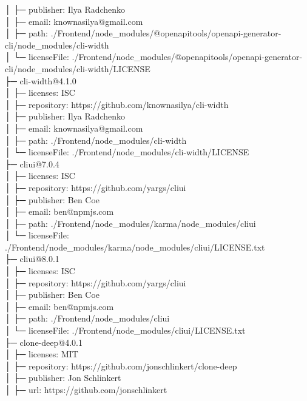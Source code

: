 \documentclass[
    paper=a4,
    twoside=false,
    parskip=half,
    listof=entryprefix,
    listof=totoc,
    index=totoc,
    bibliography=totoc,
    headsepline,
]{scrbook}
\begin{document}
    │  ├─ publisher: Ilya Radchenko\\
    │  ├─ email: knownasilya@gmail.com\\
    │  ├─ path: ./Frontend/node\_modules/@openapitools/openapi-generator-cli/node\_modules/cli-width\\
    │  └─ licenseFile: ./Frontend/node\_modules/@openapitools/openapi-generator-cli/node\_modules/cli-width/LICENSE\\
    ├─ cli-width@4.1.0\\
    │  ├─ licenses: ISC\\
    │  ├─ repository: https://github.com/knownasilya/cli-width\\
    │  ├─ publisher: Ilya Radchenko\\
    │  ├─ email: knownasilya@gmail.com\\
    │  ├─ path: ./Frontend/node\_modules/cli-width\\
    │  └─ licenseFile: ./Frontend/node\_modules/cli-width/LICENSE\\
    ├─ cliui@7.0.4\\
    │  ├─ licenses: ISC\\
    │  ├─ repository: https://github.com/yargs/cliui\\
    │  ├─ publisher: Ben Coe\\
    │  ├─ email: ben@npmjs.com\\
    │  ├─ path: ./Frontend/node\_modules/karma/node\_modules/cliui\\
    │  └─ licenseFile: ./Frontend/node\_modules/karma/node\_modules/cliui/LICENSE.txt\\
    ├─ cliui@8.0.1\\
    │  ├─ licenses: ISC\\
    │  ├─ repository: https://github.com/yargs/cliui\\
    │  ├─ publisher: Ben Coe\\
    │  ├─ email: ben@npmjs.com\\
    │  ├─ path: ./Frontend/node\_modules/cliui\\
    │  └─ licenseFile: ./Frontend/node\_modules/cliui/LICENSE.txt\\
    ├─ clone-deep@4.0.1\\
    │  ├─ licenses: MIT\\
    │  ├─ repository: https://github.com/jonschlinkert/clone-deep\\
    │  ├─ publisher: Jon Schlinkert\\
    │  ├─ url: https://github.com/jonschlinkert\\
\end{document}
